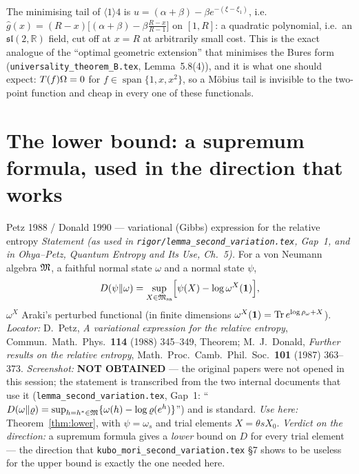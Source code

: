 \documentclass[11pt]{article}
\newcommand{\Msa}{\cM_{\mathrm{sa}}}\newcommand{\Mpsa}{\cM'_{\mathrm{sa}}}
\begin{document}
\begin{remark}\label{rem:mobius}
The minimising tail of $\langle1\rangle4$ is $u=(\alpha+\beta)-\beta e^{-(\xi-\xi_1)}$, i.e.
$\hat g(x)=(R-x)\bigl[(\alpha+\beta)-\beta\frac{R-x}{R-1}\bigr]$ on $[1,R]$: a quadratic polynomial, i.e.\ an
$\mathfrak{sl}(2,\mathbb R)$ field, cut off at $x=R$ at arbitrarily small cost.  This is the exact analogue
of the ``optimal geometric extension'' that minimises the Bures form
(\texttt{universality\_theorem\_B.tex}, Lemma~5.8(4)), and it is what one should expect: $T(f)\Omega=0$ for
$f\in\operatorname{span}\{1,x,x^2\}$, so a M\"obius tail is invisible to the two-point function and cheap in
every one of these functionals.
\end{remark}

\section{The lower bound: a supremum formula, used in the direction that works}\label{sec:lower}

\begin{citedbox}{Petz 1988 / Donald 1990 --- variational (Gibbs) expression for the relative entropy}
\emph{Statement (as used in \texttt{rigor/lemma\_second\_variation.tex}, Gap~1, and in Ohya--Petz,
\emph{Quantum Entropy and Its Use}, Ch.~5).}  For a von Neumann algebra $\mathfrak M$, a faithful normal state
$\omega$ and a normal state $\psi$,
\[
 D(\psi\Vert\omega)=\sup_{X\in\Msa}\Bigl[\psi(X)-\log\omega^{X}(\one)\Bigr],
\]
$\omega^X$ Araki's perturbed functional (in finite dimensions $\omega^X(\mathbf 1)=\operatorname{Tr} e^{\log\rho_\omega+X}$).
\emph{Locator:} D.~Petz, \emph{A variational expression for the relative entropy}, Commun.\ Math.\ Phys.\
\textbf{114} (1988) 345--349, Theorem; M.~J.~Donald, \emph{Further results on the relative entropy}, Math.\
Proc.\ Camb.\ Phil.\ Soc.\ \textbf{101} (1987) 363--373.  \emph{Screenshot:} \textbf{NOT OBTAINED} --- the
original papers were not opened in this session; the statement is transcribed from the two internal
documents that use it (\texttt{lemma\_second\_variation.tex}, Gap~1: ``$D(\omega\Vert\varrho)=\sup_{h=h^*\in\mathfrak M}
\{\omega(h)-\log\varrho(e^h)\}$'') and is standard.
\emph{Use here:} Theorem~\ref{thm:lower}, with $\psi=\omega_s$ and trial elements $X=\theta sX_0$.
\emph{Verdict on the direction:} a supremum formula gives a \emph{lower} bound on $D$ for every trial
element --- the direction that \texttt{kubo\_mori\_second\_variation.tex} \S7 shows to be useless for the
upper bound is exactly the one needed here.
\end{citedbox}
\end{document}
